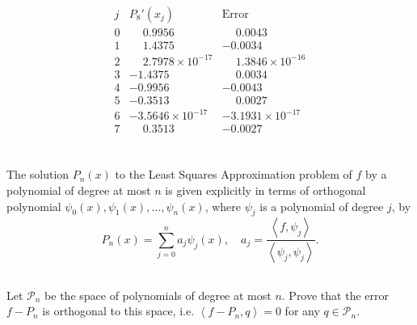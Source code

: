 \documentclass[12pt]{article}
\newenvironment{problem}
    {\begin{lrbox}{\mybox}\begin{minipage}{0.98\textwidth}}
    {\end{minipage}\end{lrbox}\framebox[\textwidth]{\usebox{\mybox}}}
\newcommand{\<}{\left\langle}
\renewcommand{\>}{\right\rangle}
\newcommand{\PP}{\mathcal{P}}
\begin{document}
\[\begin{array}{c|l|l}
    j & P_8'(x_j) & \text{Error} \\
    \hline
    0 & \phantom{-}0.9956     & \phantom{-}0.0043 \\
    1 & \phantom{-}1.4375      & -0.0034 \\
    2 & \phantom{-}2.7978\times10^{-17}   & \phantom{-}1.3846\times10^{-16} \\
    3 & -1.4375     & \phantom{-}0.0034 \\
    4 & -0.9956    & -0.0043 \\
    5 & -0.3513     & \phantom{-}0.0027 \\
    6 & -3.5646\times10^{-17} & -3.1931\times10^{-17} \\
    7 & \phantom{-}0.3513     & -0.0027
\end{array}\]



\newpage
\section{}
\begin{problem}
    The solution $P_n(x)$ to the Least Squares Approximation problem of $f$ by a polynomial of degree at most $n$ is given explicitly in terms of orthogonal polynomial $\psi_0(x), \psi_1(x), \dots, \psi_n(x)$, where $\psi_j$ is a polynomial of degree $j$, by
    \[
        P_n(x) = \sum_{j=0}^n a_j \psi_j(x), \quad a_j = \frac{\< f, \psi_j \>}{\< \psi_j, \psi_j \>}.
    \]
\end{problem}

\subsection{}
\begin{problem}
    Let $\PP_n$ be the space of polynomials of degree at most $n$. Prove that the error $f - P_n$ is orthogonal to this space, i.e. $\< f - P_n, q \> = 0$ for any $q \in \PP_n$.
\end{problem}
\end{document}
